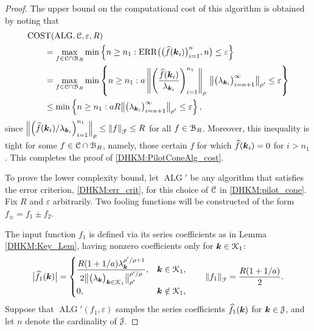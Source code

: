 \documentclass[USenglish]{article}
\theoremstyle{dgthm}
\theoremstyle{dgthm}
\theoremstyle{dgthm}
\theoremstyle{dgthm}
\theoremstyle{dgdef}
\DeclareMathOperator{\ALG}{ALG}
\DeclareMathOperator{\ERR}{ERR}
\newcommand{\dataN}{\bigl(\hf(\bsk_i)\bigr)_{i=1}^n}
\newcommand{\ERRN}{\ERR\bigl(\dataN,n\bigr)}
\DeclareMathOperator{\COST}{COST}
\newcommand{\hf}{\widehat{f}}
\newcommand{\bigabs}[1]{\ensuremath{\bigl \lvert #1 \bigr \rvert}}
\newcommand{\norm}[2][{}]{\ensuremath{\left \lVert #2 \right \rVert}_{#1}}
\newcommand{\bignorm}[2][{}]{\ensuremath{\bigl \lVert #2 \bigr \rVert}_{#1}}
\begin{document}
\begin{proof} 
The upper bound on the computational cost of this algorithm is obtained by noting that 
\begin{align*}
    \MoveEqLeft{\COST(\ALG,\calC,\varepsilon,R)} \\
    & = \max_{f \in \calC \cap \calB_{R}} \min \left \{n \ge n_1 : \ERRN \le \varepsilon \right \} \\
     & = \max_{f \in \calC \cap \calB_{R}} \min \left \{n \ge n_1 : 
     a \norm[\rho]{\left( \frac{\hf(\bsk_i)}{\lambda_{\bsk_i}} \right)_{i=1}^{n_1}} \, 
     \bignorm[\rho']{\bigl(  \lambda_{\bsk_i}  \bigr)_{i = n+1}^{\infty}}
    \le \varepsilon \right \} \\   
     & \le \min \left \{n \ge n_1 : 
     a R \bignorm[\rho']{\bigl(  \lambda_{\bsk_i}  \bigr)_{i = n+1}^{\infty}} 
    \le \varepsilon \right \},  
\end{align*}
since $\norm[\rho]{\left( \hf(\bsk_i)/\lambda_{\bsk_i} \right)_{i=1}^{n_1}} \le \norm[\calF]{f} \le R$ for all $f \in {\mathcal{B}}_R$.  Moreover, this inequality is tight for some $f \in {\mathcal{C}} \cap {\mathcal{B}}_{R}$, namely, those certain $f$ for which $\hf(\bsk_i) = 0$ for $i > n_1$.  This completes the proof of \eqref{DHKM:PilotConeAlg_cost}.

To prove the lower complexity bound, let $\ALG'$ be any algorithm that satisfies the error criterion, \eqref{DHKM:err_crit}, for this choice of ${\mathcal{C}}$ in \eqref{DHKM:pilot_cone}.   Fix $R$ and $\varepsilon$ arbitrarily.  Two fooling functions will be constructed of the form $f_\pm = f_1 \pm f_2$.  

The input function $f_1$ is defined via its series coefficients as in Lemma \ref{DHKM:Key_Lem}, having nonzero coefficients only for ${\boldsymbol{k}} \in {\mathcal{K}}_1$:
\begin{equation*}
    \bigabs{\hf_1(\bsk)} = \begin{cases} \displaystyle \frac{R (1+1/a) \lambda_{\bsk}^{\rho'/\rho + 1}}{2\bignorm[\rho']{\bigl(  \lambda_{\bsk}  \bigr)_{\bsk \in \calK_1}}^{\rho'/\rho}}, &  \bsk \in \calK_1, \\
    0, & \bsk \notin \calK_1,
    \end{cases}
   \qquad \norm[\calF]{f_1} = \frac{R(1 + 1/a)}{2}.
\end{equation*}
Suppose that $\ALG'(f_1,\varepsilon)$ samples the series coefficients $\hf_1(\bsk)$ for ${\boldsymbol{k}} \in {\mathcal{J}}$, and let $n$ denote the cardinality of ${\mathcal{J}}$.  


\end{proof}
\end{document}
